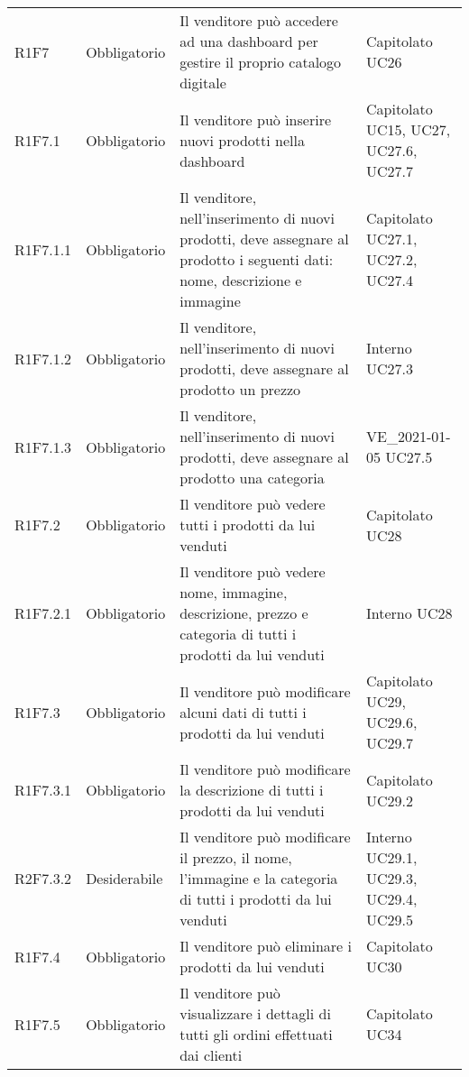 {\begin{longtable}{C{2.5cm} C{2.8cm} C{6.7cm} C{2.5cm}}
R1F7 & Obbligatorio & Il venditore può accedere ad una dashboard per gestire il proprio catalogo digitale & Capitolato \newline UC26\\
R1F7.1 & Obbligatorio & Il venditore può inserire nuovi prodotti nella dashboard & Capitolato \newline UC15, UC27, UC27.6, UC27.7\\
R1F7.1.1 & Obbligatorio & Il venditore, nell'inserimento di nuovi prodotti, deve assegnare al prodotto i seguenti dati: nome, descrizione e immagine & Capitolato \newline UC27.1, UC27.2, UC27.4\\
R1F7.1.2 & Obbligatorio & Il venditore, nell'inserimento di nuovi prodotti, deve assegnare al prodotto un prezzo & Interno \newline UC27.3\\ 
R1F7.1.3 & Obbligatorio & Il venditore, nell'inserimento di nuovi prodotti, deve assegnare al prodotto una categoria & VE\_2021-01-05 \newline UC27.5\\ 
R1F7.2 & Obbligatorio & Il venditore può vedere tutti i prodotti da lui venduti & Capitolato \newline UC28 \\
R1F7.2.1 & Obbligatorio & Il venditore può vedere nome, immagine, descrizione, prezzo e categoria di tutti i prodotti da lui venduti & Interno \newline UC28\\
R1F7.3 & Obbligatorio & Il venditore può modificare alcuni dati di tutti i prodotti da lui venduti & Capitolato \newline UC29, UC29.6, UC29.7 \\
R1F7.3.1 & Obbligatorio & Il venditore può modificare la descrizione di tutti i prodotti da lui venduti & Capitolato \newline UC29.2\\
R2F7.3.2 & Desiderabile & Il venditore può modificare il prezzo, il nome, l'immagine e la categoria di tutti i prodotti da lui venduti & Interno \newline UC29.1, UC29.3, UC29.4, UC29.5\\
R1F7.4 & Obbligatorio & Il venditore può eliminare i prodotti da lui venduti & Capitolato \newline UC30 \\
R1F7.5 & Obbligatorio & Il venditore può visualizzare i dettagli di tutti gli ordini effettuati dai clienti & Capitolato \newline UC34\\

\end{longtable}}
